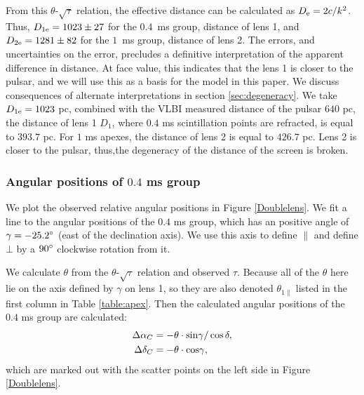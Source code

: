 \documentclass[useAMS,usenatbib]{mn2e}
\begin{document}
From this $\theta$-$\sqrt{\tau}$ relation, the effective distance can be calculated as $D_{\rm e}=2c/k^2$. Thus,
$D_{1{\rm e}}=1023\pm 27$ for the  $0.4$\ ms group, distance of lens 1, and
$D_{2{\rm e}} = 1281 \pm 82$ for the $1$\ ms group, distance of lens 2.
The errors, and uncertainties on the error, precludes a definitive
interpretation of the apparent difference in distance.  At face value, 
this indicates that the lens 1 is closer to the pulsar, and we will
use this as a basis for the model in this paper.  We discuss
consequences of alternate interpretations in section \ref{sec:degeneracy}.
We take $D_{1{\rm e}}=1023$ pc, combined with the VLBI measured distance of the pulsar $640$ pc, the distance of lens 1 $D_{1}$, where $0.4$ ms scintillation points are refracted, is equal to $393.7$ pc. For $1$ ms apexes, the distance of lens 2 is equal to $426.7$ pc. Lens 2 is closer to the pulsar, thus,the degeneracy of the distance of the screen is broken.

\subsubsection{Angular positions of $0.4$ ms group}
\label{subsec:angularpos}
We plot the observed relative angular positions in Figure \ref{Doublelens}. We fit a line to the angular positions of the $0.4$ ms group, which has an positive angle of $\gamma=-25.2\degree$ (east of the declination axis). We use this axis to define ${\parallel}$ and define ${\bot}$ by a $90\degree$ clockwise rotation from it. 

We calculate $\theta$ from the $\theta$-$\sqrt{\tau}$ relation and observed $\tau$. Because all of the $\theta$ here lie on the axis defined by $\gamma$ on lens 1, so they are also denoted $\theta_{1\parallel}$ listed in the first column in Table \ref{table:apex}. Then the calculated angular positions of the $0.4$ ms group are calculated:
\begin{equation}
\begin{aligned}
{\Delta\alpha_C}&=-\theta \cdot {\rm sin}\gamma/\cos{\delta}, \\
{\Delta\delta_C}&=-\theta \cdot {\rm cos}\gamma,
\end{aligned}
\end{equation}
which are marked out with the scatter points on the left side in Figure \ref{Doublelens}.
\end{document}
